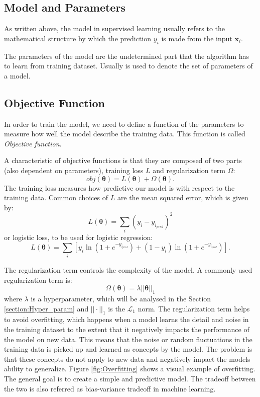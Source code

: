 \documentclass[a4paper, oneside, 11pt, openright]{book}
\begin{document}
			\subsection{Model and Parameters}
			As written above, the model in supervised learning usually refers to the mathematical structure by which the prediction $y_i$ is made from the input $\textbf{x}_i$.
		
			The parameters of the model are the undetermined part that the algorithm has to learn from training dataset. Usually \bm{$\theta$} is used to denote the set of parameters of a model.
		
			\subsection{Objective Function}
			In order to train the model, we need to define a function of the parameters to measure how well the model describe the training data. This function is called \textit{Objective function}.
			
			A characteristic of objective functions is that they are composed of two parts (also dependent on parameters), training loss $L$ and regularization term $\Omega$:
			$$
			obj(\bm{\theta}) = L(\bm{\theta}) + \Omega(\bm{\theta}).
			$$
			The training loss measures how predictive our model is with respect to the training data. Common choices of $L$ are the mean squared error, which is given by:
			$$
			L(\bm{\theta}) = \sum_{i}(y_i - y_{i_{pred}})^2
			$$
			or logistic loss, to be used for logistic regression:
			$$
			L(\bm{\theta}) = \sum_{i}  [{ y_i\ln(1+e^{-y_{i_{pred}}}) + (1-y_i) \ln(1+e^{-y_{i_{pred}}})    }].
			$$
			
			The regularization term controls the complexity of the model. A commonly used regularization term is:
			$$
			\Omega(\bm{\theta}) = \lambda||\bm{\theta}||_1
			$$
			where $\lambda$ is a hyperparameter, which will be analysed in the Section \ref{section:Hyper_param} and $||\cdot||_1$ is the $\mathcal{L}_1$ norm. The regularization term helps to avoid overfitting, which happens when a model learns the detail and noise in the training dataset to the extent that it negatively impacts the performance of the model on new data. This means that the noise or random fluctuations in the training data is picked up and learned as concepts by the model. The problem is that these concepts do not apply to new data and negatively impact the models ability to generalize. Figure \ref{fig:Overfitting} shows a visual example of overfitting. The general goal is to create a simple and predictive model. The tradeoff between the two is also referred as bias-variance tradeoff in machine learning.
			
\end{document}
